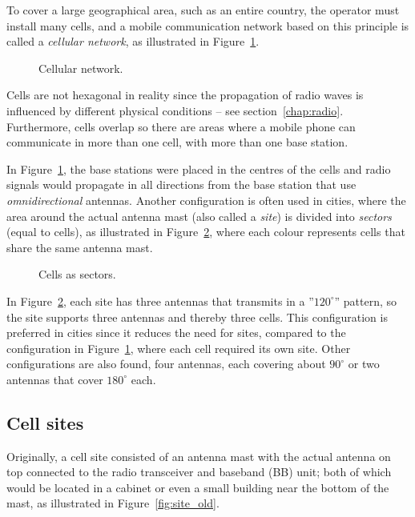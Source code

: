 To cover a large geographical area, such as an entire country, the operator must install many cells, and a mobile communication network based on this principle is called a \emph{cellular network}, as illustrated in Figure~\ref{fig:cellular}.

\begin{figure}[htbp]
\centering
{}
\caption{\label{fig:cellular}Cellular network.}
\end{figure}

Cells are not hexagonal in reality since the propagation of radio waves is influenced by different physical conditions -- see section~\ref{chap:radio}. Furthermore, cells overlap so there are areas where a mobile phone can communicate in more than one cell, \ie with more than one base station.

In Figure~\ref{fig:cellular}, the base stations were placed in the centres of the cells and radio signals would propagate in all directions from the base station that use \emph{omnidirectional} antennas. Another configuration is often used in cities, where the area around the actual antenna mast (also called a \emph{site}) is divided into \emph{sectors} (equal to cells), as illustrated in Figure~\ref{fig:sectorized_3}, where each colour represents cells that share the same antenna mast.

\begin{figure}[htbp]
\centering
{}
\caption{\label{fig:sectorized_3}Cells as sectors.}
\end{figure}

In Figure~\ref{fig:sectorized_3}, each site has three antennas that transmits in a ''$120^\circ$'' pattern, so the site supports three antennas and thereby three cells. This configuration is preferred in cities since it reduces the need for sites, compared to the configuration in Figure~\ref{fig:cellular}, where each cell required its own site. Other configurations are also found, \eg four antennas, each covering about $90^\circ$ or two antennas that cover $180^\circ$ each.

\subsection{Cell sites}
Originally, a cell site consisted of an antenna mast with the actual antenna on top connected to the radio transceiver and baseband (BB) unit; both of which would be located in a cabinet or even a small building near the bottom of the mast, as illustrated in Figure~\ref{fig:site_old}.

